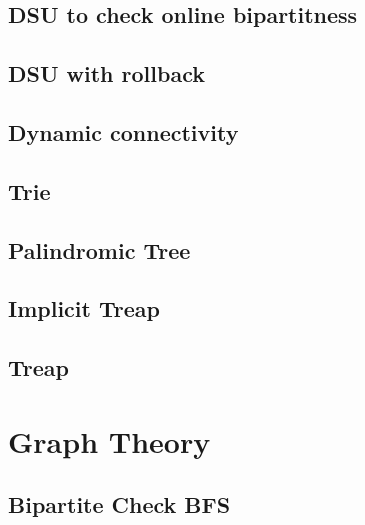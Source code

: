 \documentclass[10pt]{article}
\begin{document}
\begin{multicols*}{2}
\subsection{DSU to check online bipartitness}


\subsection{DSU with rollback}


\subsection{Dynamic connectivity}


\subsection{Trie}


\subsection{Palindromic Tree}


\subsection{Implicit Treap}


\subsection{Treap}



\section{Graph Theory}

\subsection{Bipartite Check BFS}



\end{multicols*}
\end{document}
